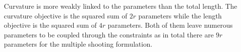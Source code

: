 Curvature is more weakly linked to the parameters than the total length. The curvature objective is the squared sum of $2r$ parameters while the length objective is the squared sum of $4r$ parameters. Both of them leave numerous parameters to be coupled through the constraints as in total there are $9r$ parameters for the multiple shooting formulation.  

